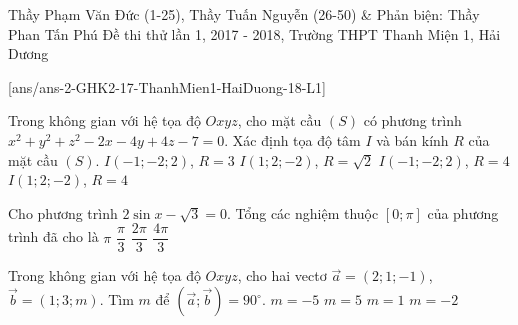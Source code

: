 
\begin{name}
{Thầy Phạm Văn Đức (1-25), Thầy Tuấn Nguyễn (26-50) \& Phản biện: Thầy Phan Tấn Phú}
{Đề thi thử lần 1, 2017 - 2018, Trường THPT Thanh Miện 1, Hải Dương}
\end{name}
\setcounter{ex}{0}\setcounter{bt}{0}
[ans/ans-2-GHK2-17-ThanhMien1-HaiDuong-18-L1]
\begin{ex}%
	Trong không gian với hệ tọa độ $Oxyz$,  cho mặt cầu $(S)$ có phương trình  \break $x^2+y^2+z^2-2x-4y+4z-7=0$. Xác định tọa độ tâm $I$ và bán kính $R$ của mặt cầu $(S)$.
	\choice
	{$I(-1;-2;2)$, $R=3$}
	{$I(1;2;-2)$, $R=\sqrt{2}$}
	{$I(-1;-2;2)$, $R=4$}
	{\True $I(1;2;-2)$, $R=4$}
\end{ex}

\begin{ex}%
	Cho phương trình $2\sin x-\sqrt{3}=0$. Tổng các nghiệm thuộc $[0;\pi]$ của phương trình đã cho là
	\choice
	{\True $\pi$}
	{$\dfrac{\pi}{3}$}
	{$\dfrac{2\pi}{3}$}
	{$\dfrac{4\pi}{3}$}
\end{ex}

\begin{ex}%
	Trong không gian với hệ tọa độ $Oxyz$,  cho hai vectơ $\overrightarrow{a}=(2;1;-1)$, $\overrightarrow{b}=(1;3;m)$. Tìm $m$ để $\left(\overrightarrow{a};\overrightarrow{b} \right)=90^\circ$.
	\choice
	{$m=-5$}
	{\True $m=5$}
	{$m=1$}
	{$m=-2$}
\end{ex}

